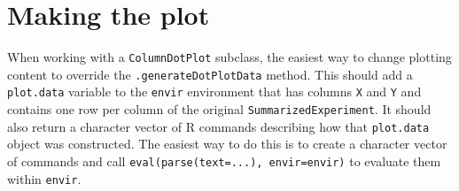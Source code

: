 \documentclass[]{book}
\begin{document}
\section{Making the plot}\label{making-the-plot}

When working with a \texttt{ColumnDotPlot} subclass, the easiest way to
change plotting content to override the \texttt{.generateDotPlotData}
method. This should add a \texttt{plot.data} variable to the
\texttt{envir} environment that has columns \texttt{X} and \texttt{Y}
and contains one row per column of the original
\texttt{SummarizedExperiment}. It should also return a character vector
of R commands describing how that \texttt{plot.data} object was
constructed. The easiest way to do this is to create a character vector
of commands and call \texttt{eval(parse(text=...),\ envir=envir)} to
evaluate them within \texttt{envir}.
\end{document}
